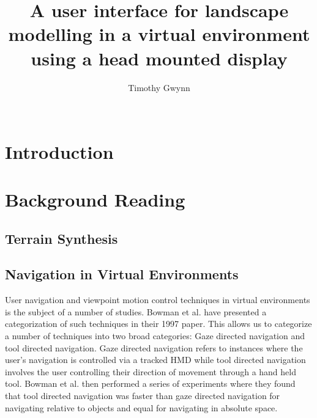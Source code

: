 \documentclass{sig-alternate-05-2015}
\begin{document}
\title{A user interface for landscape modelling in a virtual environment using a head mounted display}

\author{
\alignauthor
Timothy Gwynn\\
       \\
}
\maketitle
\begin{CCSXML}

\end{CCSXML}



\printccsdesc
{}
\begin{abstract}
	
\end{abstract}
\section{Introduction}
\section{Background Reading}
\subsection{Terrain Synthesis}
\subsection{Navigation in Virtual Environments}
User navigation and viewpoint motion control techniques in virtual environments is the subject of a number of studies. Bowman et al. have presented a categorization of such techniques in their 1997 paper\cite{Bowman1997}. This allows us to categorize a number of techniques into two broad categories: Gaze directed navigation and tool directed navigation. Gaze directed navigation refers to instances where the user's navigation is controlled via a tracked HMD while tool directed navigation involves the user controlling their direction of movement through a hand held tool. Bowman et al. then performed a series of experiments where they found that tool directed navigation was faster than gaze directed navigation for navigating relative to objects and equal for navigating in absolute space.
\end{document}
